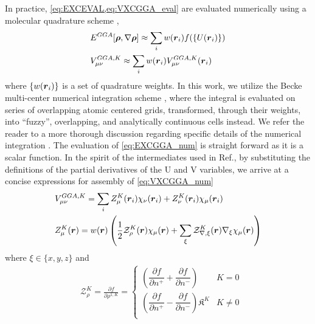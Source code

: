 In practice, \cref{eq:EXCEVAL,eq:VXCGGA_eval} are evaluated numerically using a molecular quadrature scheme
\cite{Becke88_2547,Jackson90_7453,Laming93_997,Johnson95_169,Frisch96_213,Reveles04_681,Sierka11_3097},
\begin{align}
  &E^{GGA}[\boldsymbol{\rho},\nabla\boldsymbol{\rho}] \approx \sum_i w(\boldsymbol{r}_i) f(\{U(\boldsymbol{r}_i)\}) \label{eq:EXCGGA_num}\\
  &V^{GGA,K}_{\mu\nu} \approx \sum_i w(\boldsymbol{r}_i) V^{GGA,K}_{\mu\nu}(\boldsymbol{r}_i) \label{eq:VXCGGA_num}
\end{align}
where $\{w(\boldsymbol{r}_i)\}$ is a set of quadrature weights. 
In this work, we utilize the Becke multi-center numerical integration scheme
\cite{Becke88_2547}, where the integral is evaluated on series of overlapping
atomic centered grids, transformed, through their weights, into ``fuzzy'',
overlapping, and analytically continuous cells instead.  We refer the
reader to a more thorough discussion regarding specific
details of the numerical integration \cite{Becke88_2547,Frisch96_213}.
The evaluation of \cref{eq:EXCGGA_num} is straight forward as it is a scalar function. In the spirit of the intermediates used
in Ref.\cite{Sierka11_3097}, by substituting the definitions of the partial derivatives of the U and V variables, we arrive
at a concise expressions for assembly of \cref{eq:VXCGGA_num} 
\begin{align}
&V^{GGA,K}_{\mu\nu} = \sum_i Z^K_\mu(\boldsymbol{r}_i) \chi_\nu(\boldsymbol{r}_i) + Z^K_\nu(\boldsymbol{r}_i) \chi_\mu(\boldsymbol{r}_i) \label{eq:VXC_point_update}\\
  &Z^K_\mu(\boldsymbol{r}) = w(\boldsymbol{r})
    \left(
      \frac{1}{2} \mathcal{Z}^K_{\rho}(\boldsymbol{r}) \chi_\mu(\boldsymbol{r}) + \sum_\xi \mathcal{Z}^K_{\nabla,\xi}(\boldsymbol{r}) \nabla_\xi \chi_\mu(\boldsymbol{r})
    \right) \label{eq:ZKmu}
\end{align}
where $\xi \in \{x,y,z\}$ and
\begin{subequations}
\begin{align}
&\mathcal{Z}^K_{\rho}=     \frac{\partial f}{\partial \rho^{1,K}} =
                                     \begin{cases}
  \left( \dfrac{\partial f}{\partial n^+} + \dfrac{\partial f}{\partial n^-} \right) & K = 0 \\[12pt]
  \left( \dfrac{\partial f}{\partial n^+} - \dfrac{\partial f}{\partial n^-} \right) \mathfrak K^{K} & K \neq 0 \\
                                     \end{cases}
\end{align}
\label{eq:ZrhoVar}
\end{subequations}

